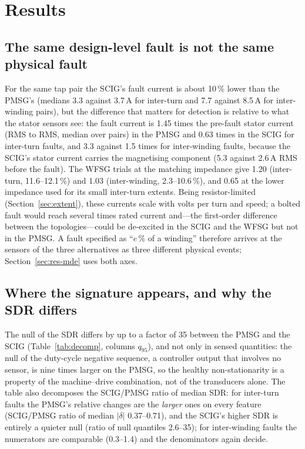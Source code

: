 \section{Results}\label{sec:results}

\subsection{The same design-level fault is not the same physical fault}\label{sec:res-severity}

For the same tap pair the SCIG's fault current is about 10\,\% lower than the PMSG's (medians 3.3 against 3.7\,A for inter-turn and 7.7 against 8.5\,A for inter-winding pairs), but the difference that matters for detection is relative to what the stator sensors see: the fault current is 1.45 times the pre-fault stator current (RMS to RMS, median over pairs) in the PMSG and 0.63 times in the SCIG for inter-turn faults, and 3.3 against 1.5 times for inter-winding faults, because the SCIG's stator current carries the magnetising component (5.3 against 2.6\,A RMS before the fault). The WFSG trials at the matching impedance give 1.20 (inter-turn, 11.6--12.1\,\%) and 1.03 (inter-winding, 2.3--10.6\,\%), and 0.65 at the lower impedance used for its small inter-turn extents. Being resistor-limited (Section~\ref{sec:extent}), these currents scale with volts per turn and speed; a bolted fault would reach several times rated current and---the first-order difference between the topologies---could be de-excited in the SCIG and the WFSG but not in the PMSG. A fault specified as ``$e$\,\% of a winding'' therefore arrives at the sensors of the three alternatives as three different physical events; Section~\ref{sec:res-mde} uses both axes.

\subsection{Where the signature appears, and why the SDR differs}\label{sec:res-where}

The null of the SDR differs by up to a factor of 35 between the PMSG and the SCIG (Table~\ref{tab:decomp}, columns $q_{95}$), and not only in sensed quantities: the null of the duty-cycle negative sequence, a controller output that involves no sensor, is nine times larger on the PMSG, so the healthy non-stationarity is a property of the machine--drive combination, not of the transducers alone. The table also decomposes the SCIG/PMSG ratio of median SDR: for inter-turn faults the PMSG's relative changes are the \emph{larger} ones on every feature (SCIG/PMSG ratio of median $|\delta|$ 0.37--0.71), and the SCIG's higher SDR is entirely a quieter null (ratio of null quantiles 2.6--35); for inter-winding faults the numerators are comparable (0.3--1.4) and the denominators again decide.

